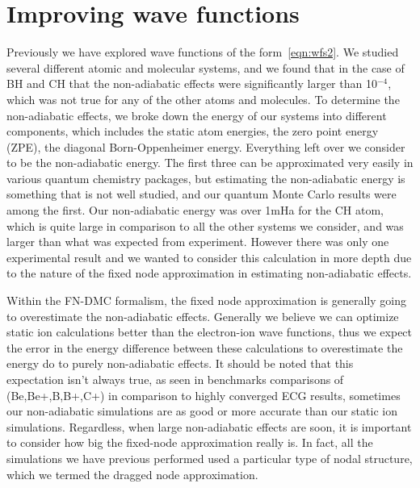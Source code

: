 \documentclass[aip,jcp,numerical,reprint]{revtex4-1}
\begin{document}

\section{Improving wave functions}
Previously we have explored wave functions of the form~\eqref{eqn:wfs2}.  We studied several different atomic and molecular systems, and we found that in the case of BH and CH that the non-adiabatic effects were  significantly larger than 10$^{-4}$, which was not true for any of the other atoms and molecules.  To determine the non-adiabatic effects, we broke down the energy of our systems into different components, which includes the static atom energies, the zero point energy (ZPE), the diagonal Born-Oppenheimer energy.   Everything left over we consider to be the non-adiabatic energy.   The first three can be approximated very easily in various quantum chemistry packages, but estimating the non-adiabatic energy is something that is not well studied, and our quantum Monte Carlo results were among the first.  Our non-adiabatic energy was over 1mHa for the CH atom, which is quite large in comparison to all the other systems we consider, and was larger than what was expected from experiment.  However there was only one experimental result and we wanted to consider this calculation in more depth due to the nature of the fixed node approximation in estimating non-adiabatic effects.

Within the FN-DMC formalism, the fixed node approximation is generally going to overestimate the non-adiabatic effects.   Generally we believe we can optimize static ion calculations better than the electron-ion wave functions, thus we expect the error in the energy difference between these calculations to overestimate the energy do to purely non-adiabatic effects.  It should be noted that this expectation isn't always true, as seen in benchmarks comparisons of (Be,Be+,B,B+,C+) in comparison to highly converged ECG results, sometimes our non-adiabatic simulations are as good or more accurate than our static ion simulations.  Regardless, when large non-adiabatic effects are soon, it is important to consider how big the fixed-node approximation really is.  In fact, all the simulations we have previous performed used a particular type of nodal structure, which we termed the dragged node approximation.
 
\end{document}
